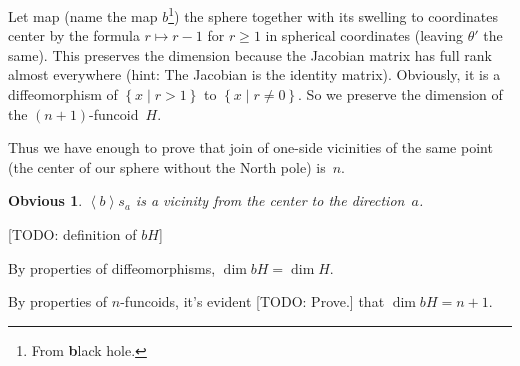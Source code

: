 \documentclass{amsart}
\newcommand{\setcond}[2]{\left\{#1\mid#2\right\}}
\newcommand{\supfun}[1]{\left\langle#1\right\rangle}
\newtheorem{obvious}{Obvious}
\begin{document}
Let map (name the map $b$\footnote{From \textbf{b}lack hole.}) the sphere together with its swelling to coordinates center by the formula $r\mapsto r-1$ for $r\geq 1$ in spherical coordinates (leaving $\theta'$ the same).
This preserves the dimension because the Jacobian matrix has full rank almost everywhere (hint: The Jacobian is the identity matrix).
Obviously, it is a diffeomorphism of $\setcond{x}{r>1}$ to $\setcond{x}{r\ne 0}$. So we preserve the dimension of the $(n+1)$-fun\-co\-id~$H$.

Thus we have enough to prove that join of one-si\-de vicinities of the same point (the center of our sphere without the North pole) is~$n$.

\begin{obvious}
$\supfun{b}s_a$ is a vicinity from the center to the direction~$a$.
\end{obvious}

[TODO: definition of $bH$]

By properties of diffeomorphisms, $\dim bH = \dim H$.

By properties of $n$-fun\-co\-ids, it's evident [TODO: Prove.] that $\dim bH=n+1$.



\end{document}
